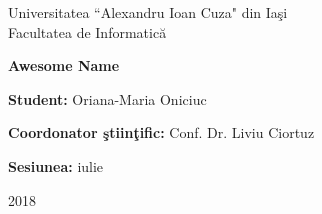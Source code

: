 \documentclass[11pt, a4papper]{report}
\theoremstyle{plain}
\theoremstyle{definition}
\theoremstyle{definition}
\theoremstyle{proposition}
\begin{document}
\begin{titlepage}

\begin{center}
Universitatea ``Alexandru Ioan Cuza" din Iaşi\\
Facultatea de Informatică\\
\end{center}

\vspace{85mm}
 
\begin{center}
\begin{Huge}
\textbf{Awesome Name}
\end{Huge}
\end{center}
 
\vspace{60mm}

\textbf{Student:} Oriana-Maria Oniciuc

\textbf{Coordonator ştiinţific:} Conf. Dr. Liviu Ciortuz

\vfill

\begin{center}
\textbf{Sesiunea:} iulie

2018
\end{center}

\end{titlepage}

\newpage
\end{document}
